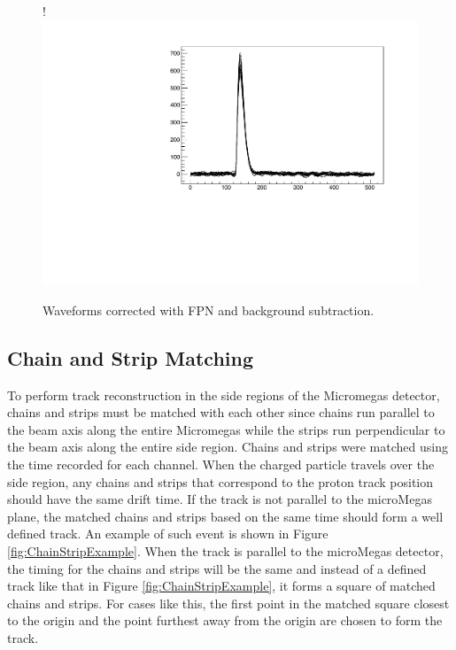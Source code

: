 \documentclass[final,number,sort&compress,5p,times,twocolumn]{elsarticle}
\begin{document}
\begin{figure}[hbt]!
    \centering
    \includegraphics[width=1.0\columnwidth]{figures/waveformCorrected}
    \caption{Waveforms corrected with FPN and background subtraction.}
    \label{fig:Waveform_Corrected}
\end{figure}

\subsection{Chain and Strip Matching \label{CSmatching}}

To perform track reconstruction in the side regions of the Micromegas detector, chains and strips must be matched with each other since chains run parallel to the beam axis along the entire Micromegas while the strips run perpendicular to the beam axis along the entire side region. Chains and strips were matched using the time recorded for each channel. When the charged particle travels over the side region, any chains and strips that correspond to the proton track position should have the same drift time. If the track is not parallel to the microMegas plane, the matched chains and strips based on the same time should form a well defined track. An example of such event is shown in Figure \ref{fig:ChainStripExample}. When the track is parallel to the microMegas detector, the timing for the chains and strips will be the same and instead of a defined track like that in Figure \ref{fig:ChainStripExample}, it forms a square of matched chains and strips. For cases like this, the first point in the matched square closest to the origin and the point furthest away from the origin are chosen to form the track.
\end{document}
